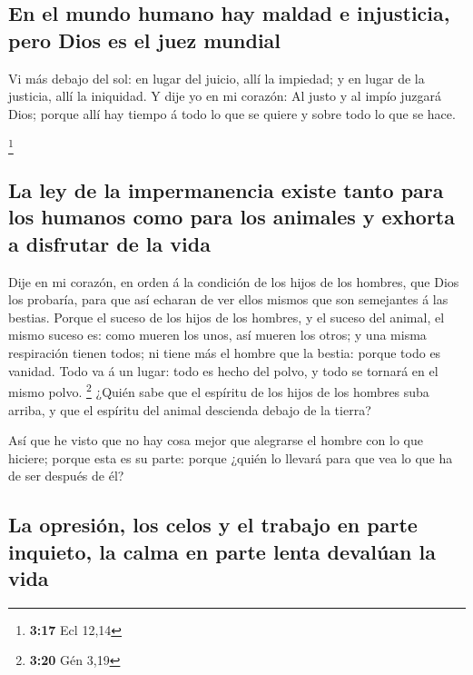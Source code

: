 \hypertarget{en-el-mundo-humano-hay-maldad-e-injusticia-pero-dios-es-el-juez-mundial}{%
\subsection{En el mundo humano hay maldad e injusticia, pero Dios es el
juez
mundial}\label{en-el-mundo-humano-hay-maldad-e-injusticia-pero-dios-es-el-juez-mundial}}

 Vi más debajo del sol: en lugar del juicio, allí la
impiedad; y en lugar de la justicia, allí la iniquidad.  Y
dije yo en mi corazón: Al justo y al impío juzgará Dios; porque allí hay
tiempo á todo lo que se quiere y sobre todo lo que se hace.

\footnote{\textbf{3:17} Ecl 12,14}

\hypertarget{la-ley-de-la-impermanencia-existe-tanto-para-los-humanos-como-para-los-animales-y-exhorta-a-disfrutar-de-la-vida}{%
\subsection{La ley de la impermanencia existe tanto para los humanos
como para los animales y exhorta a disfrutar de la
vida}\label{la-ley-de-la-impermanencia-existe-tanto-para-los-humanos-como-para-los-animales-y-exhorta-a-disfrutar-de-la-vida}}

 Dije en mi corazón, en orden á la condición de los hijos
de los hombres, que Dios los probaría, para que así echaran de ver ellos
mismos que son semejantes á las bestias.  Porque el suceso
de los hijos de los hombres, y el suceso del animal, el mismo suceso es:
como mueren los unos, así mueren los otros; y una misma respiración
tienen todos; ni tiene más el hombre que la bestia: porque todo es
vanidad.  Todo va á un lugar: todo es hecho del polvo, y
todo se tornará en el mismo polvo. \footnote{\textbf{3:20} Gén 3,19}
 ¿Quién sabe que el espíritu de los hijos de los hombres
suba arriba, y que el espíritu del animal descienda debajo de la tierra?

 Así que he visto que no hay cosa mejor que alegrarse el
hombre con lo que hiciere; porque esta es su parte: porque ¿quién lo
llevará para que vea lo que ha de ser después de él?

\hypertarget{la-opresiuxf3n-los-celos-y-el-trabajo-en-parte-inquieto-la-calma-en-parte-lenta-devaluxfaan-la-vida}{%
\subsection{La opresión, los celos y el trabajo en parte inquieto, la
calma en parte lenta devalúan la
vida}\label{la-opresiuxf3n-los-celos-y-el-trabajo-en-parte-inquieto-la-calma-en-parte-lenta-devaluxfaan-la-vida}}

